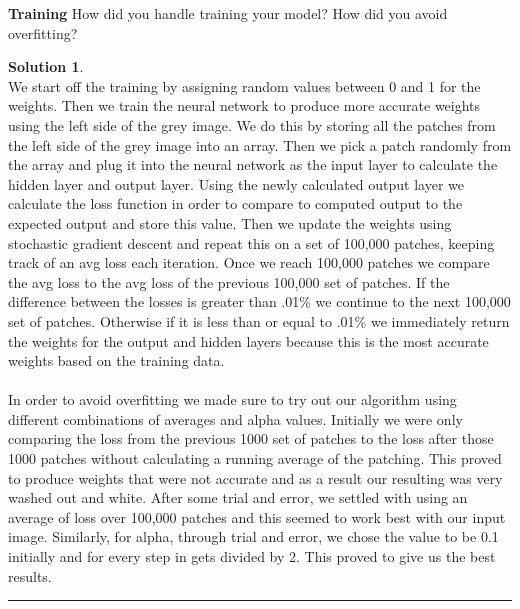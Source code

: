 \documentclass{article}
\theoremstyle{definition}
\def\fline{\rule{0.75\linewidth}{0.5pt}}
\newcommand{\finishline}{\vspace{-15pt}\begin{center}\fline\end{center}}
\newtheorem*{solution*}{Solution}
\newenvironment{solution}{\begin{solution*}}{{\finishline} \end{solution*}}
\begin{document}
    \textbf{Training}
        How did you handle training your model? How did you avoid overfitting? 
        \begin{solution} \hfill \\
        We start off the training by assigning random values between 0 and 1 for the weights. Then we train the neural network to produce more accurate weights using the left side of the grey image. We do this by storing all the patches from the left side of the grey image into an array. Then we pick a patch randomly from the array and plug it into the neural network as the input layer to calculate the hidden layer and output layer. Using the newly calculated output layer we calculate the loss function in order to compare to computed output to the expected output and store this value. Then we update the weights using stochastic gradient descent and repeat this on a set of 100,000 patches, keeping track of an avg loss each iteration. Once we reach 100,000 patches we compare the avg loss to the avg loss of the previous 100,000 set of patches. If the difference between the losses is greater than .01\% we continue to the next 100,000 set of patches. Otherwise if it is less than or equal to .01\% we immediately return the weights for the output and hidden layers because this is the most accurate weights based on the training data.\\\\
        In order to avoid overfitting we made sure to try out our algorithm using different combinations of averages and alpha values. Initially we were only comparing the loss from the previous 1000 set of patches to the loss after those 1000 patches without calculating a running average of the patching. This proved to produce weights that were not accurate and as a result our resulting was very washed out and white. After some trial and error, we settled with using an average of loss over 100,000 patches and this seemed to work best with our input image. Similarly, for alpha, through trial and error, we chose the value to be 0.1 initially and for every step in gets divided by 2. This proved to give us the best results.
        \end{solution}\\\\
        
\end{document}
